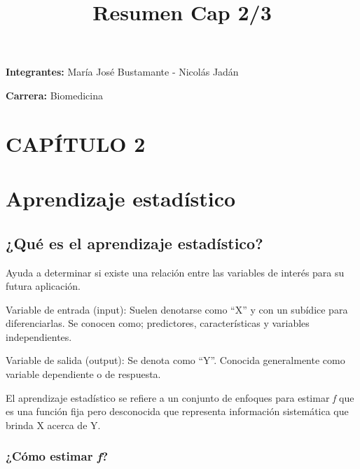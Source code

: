 \documentclass[
  letterpaper,
  DIV=11,
  numbers=noendperiod]{scrartcl}
\title{Resumen Cap 2/3}
\author{}
\date{}
\begin{document}
\maketitle
\ifdefined\Shaded\renewenvironment{Shaded}{\begin{tcolorbox}[boxrule=0pt, enhanced, frame hidden, breakable, borderline west={3pt}{0pt}{shadecolor}, sharp corners, interior hidden]}{\end{tcolorbox}}\fi

\textbf{Integrantes:} María José Bustamante - Nicolás Jadán

\textbf{Carrera:} Biomedicina

\hypertarget{capuxedtulo-2}{%
\section{CAPÍTULO 2}\label{capuxedtulo-2}}

\hypertarget{aprendizaje-estaduxedstico}{%
\section{Aprendizaje estadístico}\label{aprendizaje-estaduxedstico}}

\hypertarget{quuxe9-es-el-aprendizaje-estaduxedstico}{%
\subsection{¿Qué es el aprendizaje
estadístico?}\label{quuxe9-es-el-aprendizaje-estaduxedstico}}

Ayuda a determinar si existe una relación entre las variables de interés
para su futura aplicación.

Variable de entrada (input): Suelen denotarse como ``X'' y con un
subídice para diferenciarlas. Se conocen como; predictores,
características y variables independientes.

Variable de salida (output): Se denota como ``Y''. Conocida generalmente
como variable dependiente o de respuesta.

El aprendizaje estadístico se refiere a un conjunto de enfoques para
estimar \emph{f} que es una función fija pero desconocida que representa
información sistemática que brinda X acerca de Y.

\hypertarget{cuxf3mo-estimar-f}{%
\subsubsection{\texorpdfstring{¿Cómo estimar
\emph{f}?}{¿Cómo estimar f?}}\label{cuxf3mo-estimar-f}}
\end{document}
